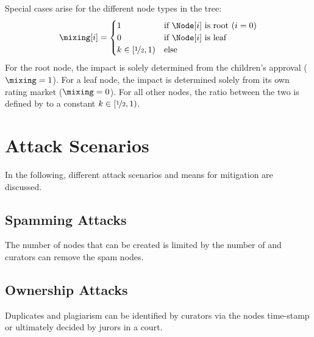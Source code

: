 \documentclass[%
aip,
amsmath,amssymb,
reprint,%
unsortedaddress,
nofootinbib
]{revtex4-2}
\begin{document}
Special cases arise for the different node types in the tree:
\begin{equation}
	\mixing[i] =
	\begin{cases}
		1 & \text{if $\Node[i]$ is root ($i=0$)}\\
		0 & \text{if $\Node[i]$ is leaf}\\
		k \in[\nicefrac{1}{2},1) & \text{else}
	\end{cases}
\end{equation}
For the root node, the impact is solely determined from the children's approval  ($\mixing=1$).
For a leaf node, the impact is determined solely from its own rating market ($\mixing=0$).
For all other nodes,
the ratio between the two is defined by to a constant $k\in[\nicefrac{1}{2},1)$.






\section{Attack Scenarios}
In the following, different attack scenarios and means for mitigation are discussed.

\subsection{Spamming Attacks}
The number of nodes that can be created is limited by the number of \debateTokens{} and
curators can remove the spam nodes.

\subsection{Ownership Attacks}
Duplicates and plagiarism can be identified by  curators via the nodes time-stamp
or ultimately decided by jurors in a court.
\end{document}
